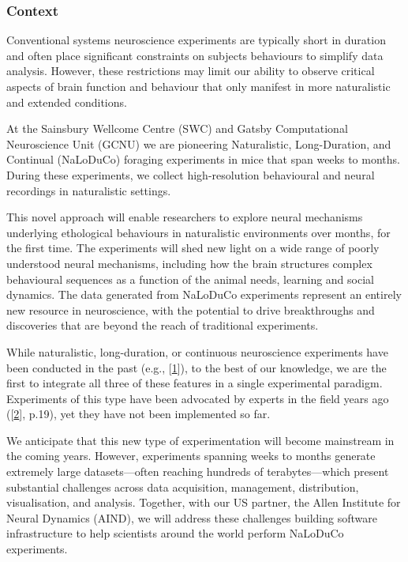 \subsubsection{Context}

Conventional systems neuroscience experiments are typically short in duration
and often place significant constraints on subjects behaviours to simplify data
analysis.
%
However, these restrictions may limit our ability to observe critical
aspects of brain function and behaviour that only manifest in more naturalistic
and extended conditions.

At the Sainsbury Wellcome Centre (SWC) and Gatsby Computational Neuroscience
Unit (GCNU) we are pioneering Naturalistic, Long-Duration, and Continual
(NaLoDuCo) foraging experiments in mice that span weeks to months. During these
experiments, we collect high-resolution behavioural and neural recordings in
naturalistic settings.

This novel  approach will enable researchers to explore neural mechanisms
underlying ethological behaviours in naturalistic environments over months, for
the first time.  The experiments will shed new light on a wide range of poorly
understood neural mechanisms, including how the brain structures complex
behavioural sequences as a function of the animal needs, learning and social
dynamics.
%
The data generated from NaLoDuCo experiments represent an entirely new resource
in neuroscience, with the potential to drive breakthroughs and discoveries that
are beyond the reach of traditional experiments.

While naturalistic, long-duration, or continuous neuroscience experiments have
been conducted in the past (e.g.,
[\href{https://pubmed.ncbi.nlm.nih.gov/37656619/}{1}]), to the best of our
knowledge, we are the first to integrate all three of these features in a
single experimental paradigm.
%
Experiments of this type have been advocated by experts in the field years ago
([\href{https://pubmed.ncbi.nlm.nih.gov/31600508/}{2}], p.19), yet they have
not been implemented so far.

We anticipate that this new type of experimentation will become mainstream in
the coming years.
%
However, experiments spanning weeks to months generate extremely large
datasets—often reaching hundreds of terabytes—which present substantial
challenges across data acquisition, management, distribution, visualisation,
and analysis.
%
Together, with our US partner, the Allen Institute for Neural Dynamics (AIND),
we will address these challenges building software infrastructure to help
scientists around the world perform NaLoDuCo experiments.

